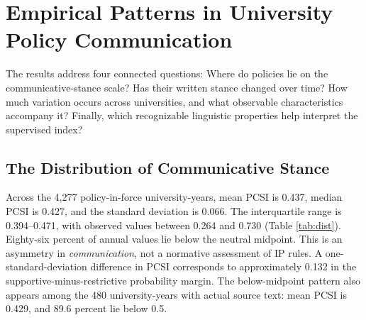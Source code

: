 \documentclass[11pt]{article}
\begin{document}
\section{Empirical Patterns in University Policy Communication}
The results address four connected questions: Where do policies lie on the communicative-stance scale? Has their written stance changed over time? How much variation occurs across universities, and what observable characteristics accompany it? Finally, which recognizable linguistic properties help interpret the supervised index?

\subsection{The Distribution of Communicative Stance}
Across the 4,277 policy-in-force university-years, mean PCSI is 0.437, median PCSI is 0.427, and the standard deviation is 0.066. The interquartile range is 0.394--0.471, with observed values between 0.264 and 0.730 (Table \ref{tab:dist}). Eighty-six percent of annual values lie below the neutral midpoint. This is an asymmetry in \emph{communication}, not a normative assessment of IP rules. A one-standard-deviation difference in PCSI corresponds to approximately 0.132 in the supportive-minus-restrictive probability margin. The below-midpoint pattern also appears among the 480 university-years with actual source text: mean PCSI is 0.429, and 89.6 percent lie below 0.5.
\end{document}
